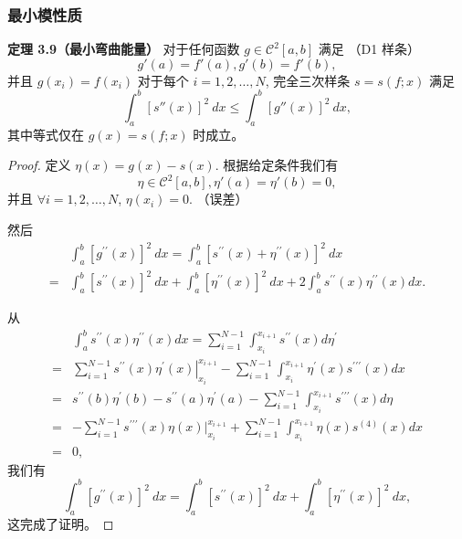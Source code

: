 \documentclass[a4paper]{ctexart}
\begin{document}
{\subsubsection{最小模性质}


{\noindent \bfseries 定理 3.9（最小弯曲能量）} 对于任何函数 
\(g \in \mathcal{C}^{2}[a, b] \) 满足 （D1 样条） 
\[ g'(a) = f'(a), g'(b) = f'(b), \]
并且 \( g(x_i) = f(x_i) \) 对于每个 \( i = 1, 2, \ldots, N \), 完全三次样条 \( s = s(f; x) \) 满足
\[ 
\int_{a}^{b}\left[s''(x)\right]^{2}~d x \leq \int_{a}^{b}\left[g''(x)\right]^{2}~d x, \tag{3.16}
\]
其中等式仅在 \( g(x) = s(f; x) \) 时成立。

\begin{proof}
  
定义 \( \eta(x) = g(x) - s(x) \). 根据给定条件我们有 
\[ 
  \eta \in \mathcal{C}^{2}[a, b], \eta'(a) = \eta'(b) = 0,
\]
并且 \( \forall i = 1, 2, \ldots, N \), \( \eta(x_i) = 0 \). （误差）

然后
\begin{align*}
& \int_a^b \left[g^{\prime\prime}(x)\right]^2~d x = \int_a^b \left[s^{\prime\prime}(x) + \eta^{\prime\prime}(x)\right]^2~d x \\
= & \int_a^b \left[s^{\prime\prime}(x)\right]^2~d x + \int_a^b \left[\eta^{\prime\prime}(x)\right]^2~d x + 2 \int_a^b s^{\prime\prime}(x) \eta^{\prime\prime}(x) d x.
\end{align*}

从
\begin{align*}
& \int_{a}^{b} s^{\prime\prime}(x) \eta^{\prime\prime}(x) d x = \sum_{i=1}^{N-1} \int_{x_{i}}^{x_{i+1}} s^{\prime\prime}(x) d\eta^{\prime} \\
= & \sum_{i=1}^{N-1} s^{\prime\prime}(x) \left.\eta^{\prime}(x)\right|_{x_{i}}^{x_{i+1}} - \sum_{i=1}^{N-1} \int_{x_{i}}^{x_{i+1}} \eta^{\prime}(x) s^{\prime\prime\prime}(x) d x \\
= & s^{\prime\prime}(b) \eta^{\prime}(b) - s^{\prime\prime}(a) \eta^{\prime}(a) - \sum_{i=1}^{N-1} \int_{x_{i}}^{x_{i+1}} s^{\prime\prime\prime}(x) d\eta \\
= & -\sum_{i=1}^{N-1} s^{\prime\prime\prime}(x) \left.\eta(x)\right|_{x_{i}}^{x_{i+1}} + \sum_{i=1}^{N-1} \int_{x_{i}}^{x_{i+1}} \eta(x) s^{(4)}(x) d x \\
= & 0,
\end{align*} 
我们有
\[ 
\int_{a}^{b} \left[g^{\prime\prime}(x)\right]^{2}~d x = \int_{a}^{b} \left[s^{\prime\prime}(x)\right]^{2}~d x + \int_{a}^{b} \left[\eta^{\prime\prime}(x)\right]^{2}~d x, 
\]
这完成了证明。
\end{proof}


}
\end{document}
